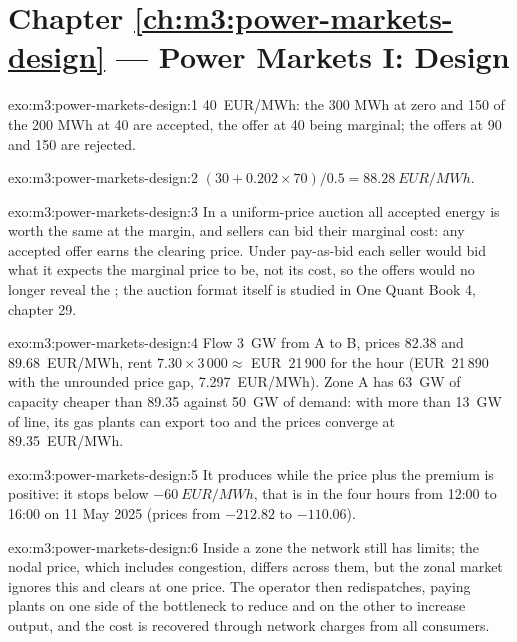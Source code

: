 \section*{Chapter \ref{ch:m3:power-markets-design} --- Power Markets I: Design}

\begin{solution}{exo:m3:power-markets-design:1}
\qty{40}{EUR/MWh}: the 300 MWh at zero and 150 of the 200 MWh at 40 are accepted, the
offer at 40 being marginal; the offers at 90 and 150 are rejected.
\end{solution}

\begin{solution}{exo:m3:power-markets-design:2}
$(30 + 0.202 \times 70)/0.5 = \qty{88.28}{EUR/MWh}$.
\end{solution}

\begin{solution}{exo:m3:power-markets-design:3}
In a uniform-price auction all accepted energy is worth the same at the margin, and
sellers can bid their marginal cost: any accepted offer earns the clearing price.
Under pay-as-bid each seller would bid what it expects the marginal price to be, not its
cost, so the offers would no longer reveal the ; the auction format itself is
studied in One Quant Book 4, chapter 29.
\end{solution}

\begin{solution}{exo:m3:power-markets-design:4}
Flow 3~GW from A to B, prices \qty{82.38}{} and \qty{89.68}{EUR/MWh}, rent $7.30 \times
3\,000 \approx$ EUR~21\,900 for the hour (EUR~21\,890 with the unrounded price gap,
\qty{7.297}{EUR/MWh}). Zone A has 63~GW of capacity cheaper than
\qty{89.35}{} against 50~GW of demand: with more than 13~GW of line, its gas plants can
export too and the prices converge at \qty{89.35}{EUR/MWh}.
\end{solution}

\begin{solution}{exo:m3:power-markets-design:5}
It produces while the price plus the premium is positive: it stops below
$-\qty{60}{EUR/MWh}$, that is in the four hours from 12:00 to 16:00 on 11 May 2025
(prices from $-212.82$ to $-110.06$).
\end{solution}

\begin{solution}{exo:m3:power-markets-design:6}
Inside a zone the network still has limits; the nodal price, which includes congestion,
differs across them, but the zonal market ignores this and clears at one price. The
operator then redispatches, paying plants on one side of the bottleneck to reduce and on
the other to increase output, and the cost is recovered through network charges from
all consumers.
\end{solution}


